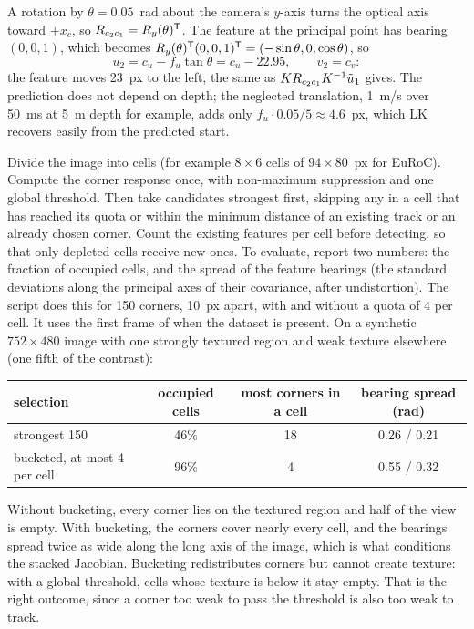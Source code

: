 \begin{solutions}
  \item A rotation by $\theta = 0.05$~rad about the camera's $y$-axis turns the optical axis toward $+x_c$, so $R_{c_2c_1} = R_y(\theta)^{\mathsf{T}}$. The feature at the principal point has
        bearing $(0, 0, 1)$, which becomes $R_y(\theta)^{\mathsf{T}}(0, 0, 1)^{\mathsf{T}} = (-\sin\theta, 0, \cos\theta)$, so
        \[
          u_2 = c_u - f_u\tan\theta = c_u - 22.95, \qquad v_2 = c_v :
        \]
        the feature moves 23~px to the left, the same as $KR_{c_2c_1}K^{-1}\tilde u_1$ gives. The prediction does not depend on depth; the neglected translation, 1~m/s
        over 50~ms at 5~m depth for example, adds only $f_u\cdot0.05/5 \approx 4.6$~px, which LK recovers easily from the predicted start.

  \item Divide the image into cells (for example $8\times6$ cells of $94\times80$~px for EuRoC). Compute the corner response once, with non-maximum suppression and
        one global threshold. Then take candidates strongest first, skipping any in a cell that has reached its quota or within the minimum distance of an
        existing track or an already chosen corner. Count the existing features per cell before detecting, so that only depleted cells receive new ones. To
        evaluate, report two numbers: the fraction of occupied cells, and the spread of the feature bearings (the standard deviations along the principal
        axes of their covariance, after undistortion). The script  does this for 150 corners, 10~px apart, with and
        without a quota of 4 per cell. It uses the first frame of  when the dataset is present. On a synthetic $752\times480$ image with one strongly
        textured region and weak texture elsewhere (one fifth of the contrast):
        \begin{center}\small
        \begin{tabular}{@{}l c c c@{}}
        \toprule
        selection & occupied cells & most corners in a cell & bearing spread (rad) \\
        \midrule
        strongest 150 & 46\% & 18 & 0.26 / 0.21 \\
        bucketed, at most 4 per cell & 96\% & 4 & 0.55 / 0.32 \\
        \bottomrule
        \end{tabular}
        \end{center}
        Without bucketing, every corner lies on the textured region and half of the view is empty. With bucketing, the corners cover nearly every cell, and
        the bearings spread twice as wide along the long axis of the image, which is what conditions the stacked Jacobian. Bucketing redistributes corners
        but cannot create texture: with a global threshold, cells whose texture is below it stay empty. That is the right outcome, since a corner too weak
        to pass the threshold is also too weak to track.


\end{solutions}
